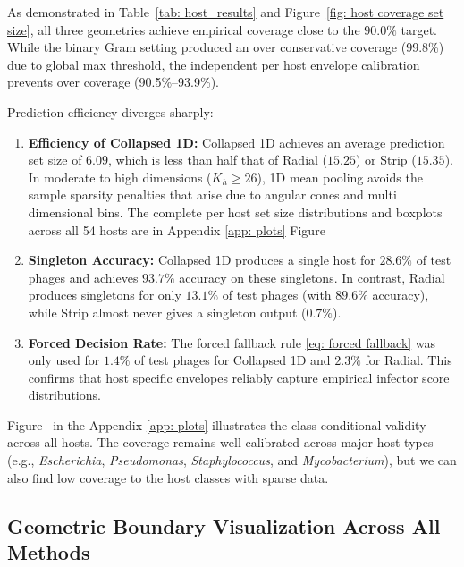 As demonstrated in Table~\ref{tab: host_results} and Figure~\ref{fig: host coverage set size}, all three geometries 
achieve empirical coverage close to the $90.0\%$ target. While the binary Gram setting produced an over conservative coverage 
(99.8\%) due to global max threshold, the independent per host envelope calibration prevents over coverage (90.5\%--93.9\%).

Prediction efficiency diverges sharply:
\begin{enumerate}[label=(\roman*)]
    \item \textbf{Efficiency of Collapsed 1D:} Collapsed 1D achieves an average prediction set size of $6.09$, which is less than 
           half that of Radial ($15.25$) or Strip ($15.35$). In moderate to high dimensions ($K_h \ge 26$), 1D mean pooling avoids 
           the sample sparsity penalties that arise due to angular cones and multi dimensional bins. The complete per host set size 
           distributions and boxplots across all 54 hosts are in Appendix \ref{app: plots} 
           Figure~
    \item \textbf{Singleton Accuracy:} Collapsed 1D produces a single host for $28.6\%$ of test phages and achieves $93.7\%$ 
           accuracy on these singletons. In contrast, Radial produces singletons for only $13.1\%$ of test phages (with $89.6\%$ 
           accuracy), while Strip almost never gives a singleton output ($0.7\%$).
    \item \textbf{Forced Decision Rate:} The forced fallback rule \eqref{eq: forced fallback} was only used for $1.4\%$ of 
           test phages for Collapsed 1D and $2.3\%$ for Radial. This confirms that host specific envelopes reliably capture 
           empirical infector score distributions.
\end{enumerate}


Figure~ in the Appendix \ref{app: plots} illustrates the class 
conditional validity across all hosts. The coverage remains well calibrated across major host types (e.g., \emph{Escherichia}, 
\emph{Pseudomonas}, \emph{Staphylococcus}, and \emph{Mycobacterium}), but we can also find low coverage to the host classes with 
 sparse data.



\subsection{Geometric Boundary Visualization Across All Methods}
\label{sec5.3.4: geometric comparison}


